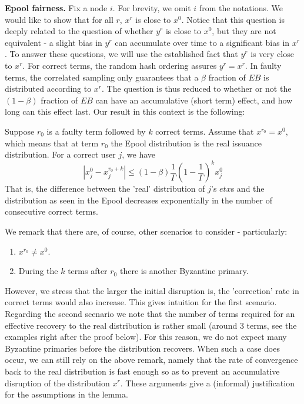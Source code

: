 \textbf{Epool fairness.} Fix a node $i$. For brevity, we omit $i$ from the notations. We would like to show that for all $r$, $x^r$ is close to $x^0$. Notice that this question is deeply related to the question of whether $y^r$ is close to $x^0$,  but they are not equivalent - a slight bias in $y^r$ can accumulate over time to a significant bias in $x^r$. To answer these questions, we will use the established fact that $y^r$ is very close to $x^r$. For correct terms, the random hash ordering assures $y^r=x^r$. In faulty terms, the correlated sampling only guarantees that a $\beta$ fraction of $EB$ is distributed according to $x^r$. The question is thus reduced to whether or not the $(1-\beta)$ fraction of $EB$ can have an accumulative (short term) effect, and how long can this effect last. Our result in this context is the following:

\begin{lemma}
    Suppose $r_0$ is a faulty term followed by $k$ correct terms. Assume that $x^{r_0}=x^0$, which means that at term $r_0$ the Epool distribution is the real issuance distribution. For a correct user $j$, we have  
    $$|x_j^0-x^{r_0+k}_j|\leq\left(1-\beta\right)\frac{1}{\Gamma}\left(1-\frac{1}{\Gamma}\right)^kx^0_j$$
     That is, the difference between the 'real' distribution of $j$'s $etx$s and the distribution as seen in the Epool decreases exponentially in the number of consecutive correct terms.
\end{lemma}

We remark that there are, of course, other scenarios to consider - particularly: 
\begin{enumerate}
\item $x^{r_0}\ne x^0$.
\item During the $k$ terms after $r_0$ there is another Byzantine primary.
\end{enumerate}
However, we stress that the larger the initial disruption is, the 'correction' rate in correct terms would also increase. This gives intuition for the first scenario. Regarding the second scenario we note that the number of terms required for an effective recovery to the real distribution is rather small (around 3 terms, see the examples right after the proof below). For this reason, we do not expect many Byzantine primaries before the distribution recovers. When such a case does occur, we can still rely on the above remark, namely that the rate of convergence back to the real distribution is fast enough so as to prevent an accumulative disruption of the distribution $x^r$. These arguments give a (informal) justification for the assumptions in the lemma.

